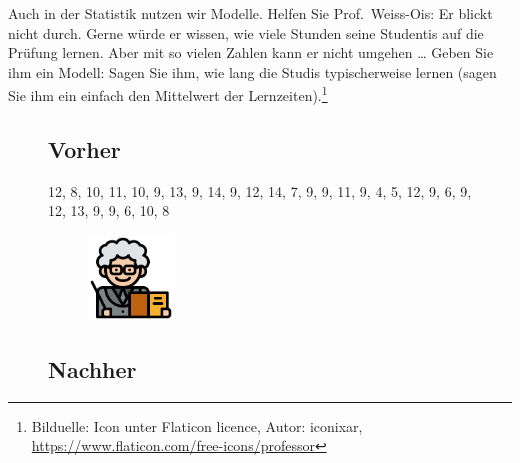 \documentclass[
  a4paper,
  DIV=11]{scrreprt}
\theoremstyle{definition}
\theoremstyle{definition}
\theoremstyle{definition}
\theoremstyle{remark}
\begin{document}
Auch in der Statistik nutzen wir Modelle. Helfen Sie Prof.~Weiss-Ois: Er
blickt nicht durch. Gerne würde er wissen, wie viele Stunden seine
Studentis auf die Prüfung lernen. Aber mit so vielen Zahlen kann er
nicht umgehen \ldots{} Geben Sie ihm ein Modell: Sagen Sie ihm, wie lang
die Studis typischerweise lernen (sagen Sie ihm ein einfach den
Mittelwert der Lernzeiten).\footnote{Bilduelle: Icon unter Flaticon
  licence, Autor: iconixar,
  \url{https://www.flaticon.com/free-icons/professor}}

\begin{figure}

\begin{minipage}{0.44\linewidth}

\subsection{Vorher}\label{vorher}

12, 8, 10, 11, 10, 9, 13, 9, 14, 9, 12, 14, 7, 9, 9, 11, 9, 4, 5, 12, 9,
6, 9, 12, 13, 9, 9, 6, 10, 8

\begin{figure}[H]

{\centering \includegraphics[width=0.25\textwidth,height=\textheight]{img/teacher.png}

}


\end{figure}%

\end{minipage}%
%
\begin{minipage}{0.11\linewidth}

\end{minipage}%
%
\begin{minipage}{0.44\linewidth}

\subsection{Nachher}\label{nachher}



\end{minipage}
\end{figure}
\end{document}
